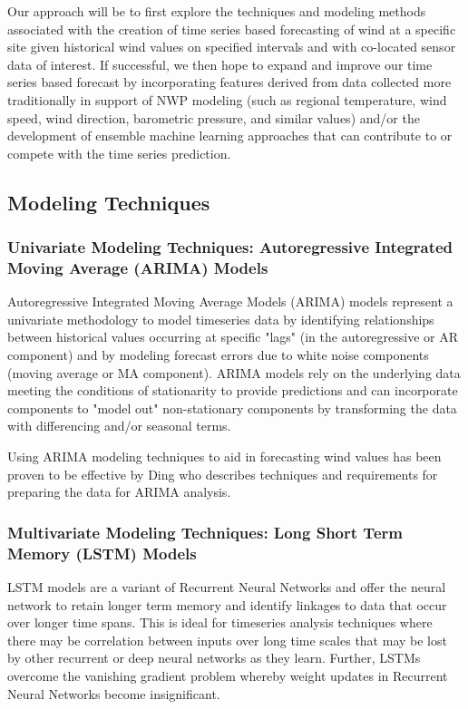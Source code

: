 \documentclass{llncs}
\begin{document}
Our approach will be to first explore the techniques and modeling methods associated with the creation of time series based forecasting of wind at a specific site given historical wind values on specified intervals and with co-located sensor data of interest. If successful, we then hope to expand and improve our time series based forecast by incorporating features derived from data collected more traditionally in support of NWP modeling (such as regional temperature, wind speed, wind direction, barometric pressure, and similar values) and/or the development of ensemble machine learning approaches that can contribute to or compete with the time series prediction.

\subsection{Modeling Techniques}

\subsubsection{Univariate Modeling Techniques: Autoregressive Integrated Moving Average (ARIMA) Models}

Autoregressive Integrated Moving Average Models (ARIMA) models represent a univariate methodology to model timeseries data by identifying relationships between historical values occurring at specific "lags" (in the autoregressive or AR component) and by modeling forecast errors due to white noise components (moving average or MA component). ARIMA models rely on the underlying data meeting the conditions of stationarity to provide predictions and can incorporate components to "model out" non-stationary components by transforming the data with differencing and/or seasonal terms.

Using ARIMA modeling techniques to aid in forecasting wind values has been proven to be effective by Ding who describes techniques and requirements for preparing the data for ARIMA analysis. \cite{Ding2019}

\subsubsection{Multivariate Modeling Techniques: Long Short Term Memory (LSTM) Models}

LSTM models are a variant of Recurrent Neural Networks and offer the neural network to retain longer term memory and identify linkages to data that occur over longer time spans. This is ideal for timeseries analysis techniques where there may be correlation between inputs over long time scales that may be lost by other recurrent or deep neural networks as they learn. Further, LSTMs overcome the vanishing gradient problem whereby weight updates in Recurrent Neural Networks become insignificant. \cite{Pulver2016}
\end{document}
